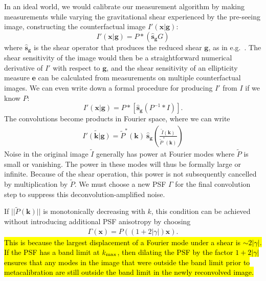 \documentclass[iop]{emulateapj}
\begin{document}
In an ideal world, we would calibrate our measurement algorithm by
making measurements while varying the gravitational shear experienced
by the pre-seeing image, constructing the counterfactual image
$I'(\mathbf{x}| {\boldsymbol g})$:
\begin{equation}
  I'({\mathbf{x}}|\mathbf{g}) = P \ast\left( \hat{\mathbf{s}}_{\mathbf{g}}G\right)
\end{equation}
where $\hat{\mathbf{s}}_{\boldsymbol g}$ is the shear operator that
produces the reduced shear $\mathbf{g}$, as in
e.g.~\cite{2002AJ....123..583B}. The shear sensitivity of the image
would then be a straightforward numerical derivative of $I'$ with
respect to $\mathbf{g}$, and the shear sensitivity of an ellipticity
measure $\mathbf{e}$ can be calculated from measurements on multiple
counterfactual images. We can even write down a formal procedure for
producing $I'$ from $I$ if we know $P$:
\begin{equation}
  I'({\mathbf{x}}|\mathbf{g}) = P \ast \left[\hat{\mathbf{s}}_\mathbf{g}\left( P^{-1} \ast I \right)\right].
\end{equation}
The convolutions become products in Fourier space, where we can write
\begin{align}
\tilde{I'({\mathbf{k}}|\mathbf{g})} = \tilde{P}^{\ast} (\mathbf{k}) \: \hat{\mathbf{s}}_\mathbf{g}\left(\frac{\tilde{I} (\mathbf{k})}{\tilde{P}^\ast (\mathbf{k})}\right)
\end{align}
Noise in the original image $\tilde{I}$ generally has power at Fourier
modes where $\tilde{P}$ is small or vanishing. The power in these
modes will thus be formally large or infinite. Because of the shear
operation, this power is not subsequently cancelled by multiplication
by $\tilde{P}$. We must choose a new PSF $\Gamma$ for the final
convolution step to suppress this deconvolution-amplified noise.

If $||\tilde{P}(\mathbf{k})||$ is monotonically decreasing with $k$,
this condition can be achieved without introducing additional PSF
anisotropy by choosing
\begin{align}
\Gamma(\mathbf{x}) = P\left((1+2|\gamma|)\mathbf{x}\right).
\end{align}
\hl{This is because the largest displacement of a Fourier mode under a
shear is $\sim 2|\gamma|$. If the PSF has a band limit at
$k_{\rm max}$, then dilating the PSF by the factor $1+2|\gamma|$
ensures that any modes in the image that were outside the band limit
prior to metacalibration are still outside the band limit in the newly
reconvolved image.}
\end{document}
